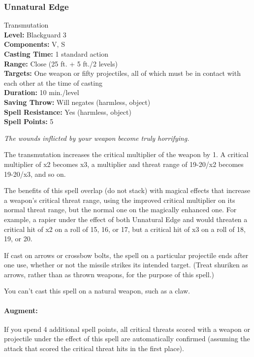 \subsubsection{Unnatural Edge}
\label{Spell:UnnaturalEdge}
Transmutation
\\ \textbf{Level:} Blackguard 3
\\ \textbf{Components:} V, S
\\ \textbf{Casting Time:} 1 standard action
\\ \textbf{Range:} Close (25 ft. + 5 ft./2 levels)
\\ \textbf{Targets:} One weapon or fifty projectiles, all of which must be in contact with each other at the time of casting
\\ \textbf{Duration:} 10 min./level
\\ \textbf{Saving Throw:} Will negates (harmless, object)
\\ \textbf{Spell Resistance:} Yes (harmless, object)
\\ \textbf{Spell Points:} 5

\emph{The wounds inflicted by your weapon become truly horrifying.}

The transmutation increases the critical multiplier of the weapon by 1. 
A critical multiplier of x2 becomes x3, a multiplier and threat range of 19-20/x2 becomes 19-20/x3, and so on. 

The benefits of this spell overlap (do not stack) with magical effects that increase a weapon's critical threat range, using the improved critical multiplier on its normal threat range, but the normal one on the magically enhanced one.
For example, a rapier under the effect of both Unnatural Edge and  would threaten a critical hit of x2 on a roll of 15, 16, or 17, but a critical hit of x3 on a roll of 18, 19, or 20.

If cast on arrows or crossbow bolts, the spell on a particular projectile ends after one use, whether or not the missile strikes its intended target. (Treat shuriken as arrows, rather than as thrown weapons, for the purpose of this spell.)

You can't cast this spell on a natural weapon, such as a claw.

\paragraph{Augment:} If you spend 4 additional spell points, all critical threats scored with a weapon or projectile under the effect of this spell are automatically confirmed (assuming the attack that scored the critical threat hits in the first place).
